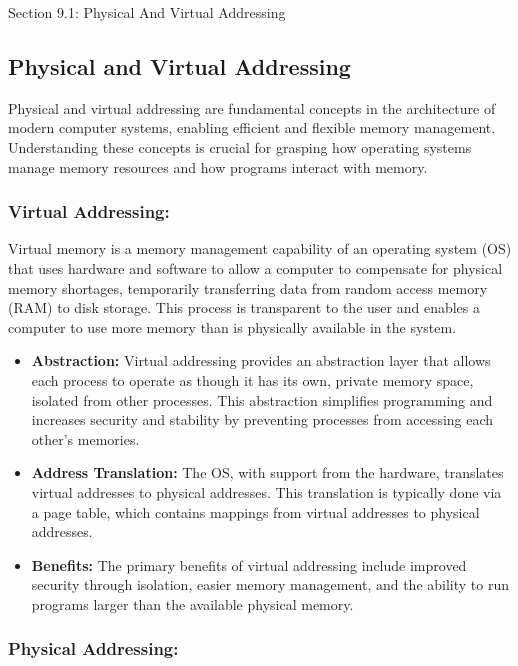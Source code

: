 \begin{notes}{Section 9.1: Physical And Virtual Addressing}
    \subsection*{Physical and Virtual Addressing}

    Physical and virtual addressing are fundamental concepts in the architecture of modern computer systems, enabling efficient and flexible memory management. Understanding these concepts is crucial 
    for grasping how operating systems manage memory resources and how programs interact with memory. \vspace*{1em}
    
    \subsubsection*{Virtual Addressing:}

    Virtual memory is a memory management capability of an operating system (OS) that uses hardware and software to allow a computer to compensate for physical memory shortages, temporarily transferring 
    data from random access memory (RAM) to disk storage. This process is transparent to the user and enables a computer to use more memory than is physically available in the system.
    
    \begin{itemize}
        \item \textbf{Abstraction:} Virtual addressing provides an abstraction layer that allows each process to operate as though it has its own, private memory space, isolated from other processes. 
        This abstraction simplifies programming and increases security and stability by preventing processes from accessing each other's memories.
        \item \textbf{Address Translation:} The OS, with support from the hardware, translates virtual addresses to physical addresses. This translation is typically done via a page table, which 
        contains mappings from virtual addresses to physical addresses.
        \item \textbf{Benefits:} The primary benefits of virtual addressing include improved security through isolation, easier memory management, and the ability to run programs larger than the 
        available physical memory.
    \end{itemize}
    
    \subsubsection*{Physical Addressing:}


\end{notes}
